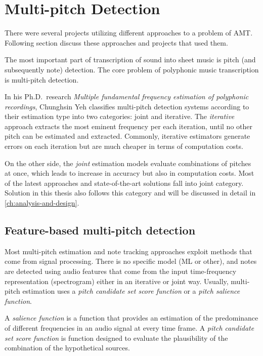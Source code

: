 \section{Multi-pitch Detection}\label{sec:multi-pitch-detection}
There were several projects utilizing different approaches to a problem of \ac{AMT}. Following section discuss these
approaches and projects that used them.

The most important part of transcription of sound into sheet music is pitch (and subsequently note) detection. The core
problem of polyphonic music transcription is multi-pitch detection.

In his Ph.D.\ research \textit{Multiple fundamental frequency estimation of polyphonic recordings}\cite{fundamental-frequency-estimation},
Chunghsin Yeh classifies multi-pitch detection systems according to their estimation type into two categories: joint and
iterative. The \textit{iterative} approach extracts the most eminent frequency per each iteration, until no other pitch
can be estimated and extracted. Commonly, iterative estimators generate errors on each iteration but are much cheaper in
terms of computation costs.

On the other side, the \textit{joint} estimation models evaluate combinations of pitches at once, which leads to
increase in accuracy but also in computation costs. Most of the latest approaches and state-of-the-art solutions fall
into joint category. Solution in this thesis also follows this category and will be discussed in detail in \cref{ch:analysis-and-design}.

\subsection{Feature-based multi-pitch detection}\label{subsec:feature-based-multi-pitch-detection}
Most multi-pitch estimation and note tracking approaches exploit methods that come from signal processing. There is no
specific model (\ac{ML} or other), and notes are detected using audio features that come from the input time-frequency
representation (spectrogram) either in an iterative or joint way. Usually, multi-pitch estimation uses a \textit{pitch
candidate set score function} or a \textit{pitch salience function}.

A \textit{salience function} is a function that provides an estimation of the predominance of different frequencies in
an audio signal at every time frame\cite{pitch-salience-function}. A \textit{pitch candidate set score function} is
function designed to evaluate the plausibility of the combination of the hypothetical sources\cite{fundamental-frequency-estimation}.

